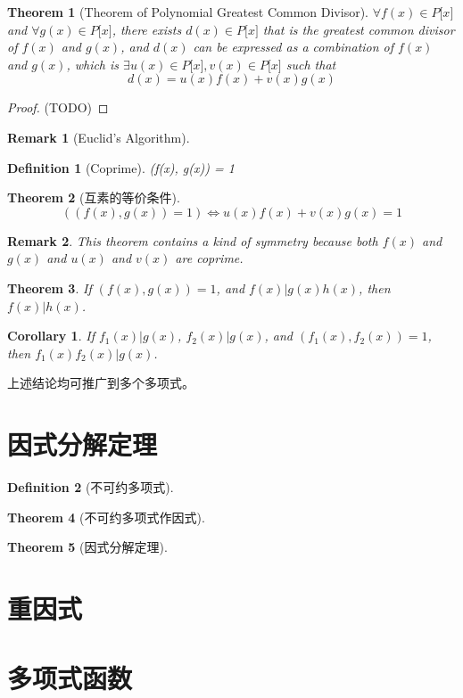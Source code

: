 \documentclass[onecolumn]{ctexart}
\newtheorem{definition}{Definition}
\newtheorem{theorem}{Theorem}
\newtheorem{corollary}{Corollary}
\newtheorem{remark}{Remark}
\begin{document}
\begin{theorem}[Theorem of Polynomial Greatest Common Divisor]
  $\forall f(x) \in P\lbrack x \rbrack$ and $\forall g(x) \in P\lbrack x \rbrack$, 
  there exists $d(x) \in P\lbrack x \rbrack$ that is the greatest common divisor 
  of $f(x)$ and $g(x)$, and $d(x)$ can be expressed as a combination of $f(x)$ 
  and $g(x)$, which is $\exists u(x) \in P\lbrack x \rbrack, v(x) \in P\lbrack x 
  \rbrack$ such that
  \[
    d(x) = u(x)f(x) + v(x)g(x)
  \]
\end{theorem}
\begin{proof}
  (TODO)
\end{proof}

\begin{remark}[Euclid's Algorithm]
  
\end{remark}

\begin{definition}[Coprime]
  (f(x), g(x)) = 1
\end{definition}

\begin{theorem}[互素的等价条件]
  \[
    ((f(x), g(x)) = 1) \Leftrightarrow u(x)f(x) + v(x)g(x) = 1
  \]
\end{theorem}
\begin{remark}
  This theorem contains a kind of symmetry because both $f(x)$ and $g(x)$ and $u(x)$ and $v(x)$ are coprime.
\end{remark}

\begin{theorem}
  If $(f(x), g(x)) = 1$, and $f(x) | g(x)h(x)$, then $f(x) | h(x)$.
\end{theorem}

\begin{corollary}
  If $f_1(x) | g(x)$, $f_2(x) | g(x)$, and $(f_1(x), f_2(x)) = 1$, then $f_1(x)f_2(x) | g(x)$.
\end{corollary}

上述结论均可推广到多个多项式。

\section{因式分解定理}
\begin{definition}[不可约多项式]
  
\end{definition}

\begin{theorem}[不可约多项式作因式]
  
\end{theorem}

\begin{theorem}[因式分解定理]
  
\end{theorem}

\section{重因式}

\section{多项式函数}
\end{document}
